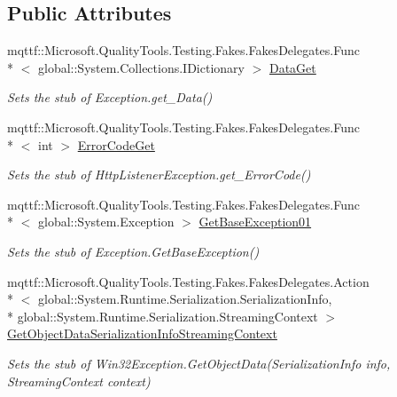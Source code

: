 \subsection*{Public Attributes}
\begin{DoxyCompactItemize}
\item 
mqttf\-::\-Microsoft.\-Quality\-Tools.\-Testing.\-Fakes.\-Fakes\-Delegates.\-Func\\*
$<$ global\-::\-System.\-Collections.\-I\-Dictionary $>$ \hyperlink{class_system_1_1_net_1_1_fakes_1_1_stub_http_listener_exception_a0e7c37c5aaf5e7d929dc7255406bb0e6}{Data\-Get}
\begin{DoxyCompactList}\small\item\em Sets the stub of Exception.\-get\-\_\-\-Data()\end{DoxyCompactList}\item 
mqttf\-::\-Microsoft.\-Quality\-Tools.\-Testing.\-Fakes.\-Fakes\-Delegates.\-Func\\*
$<$ int $>$ \hyperlink{class_system_1_1_net_1_1_fakes_1_1_stub_http_listener_exception_ac654e59004863eb65952dd2fde38d9b8}{Error\-Code\-Get}
\begin{DoxyCompactList}\small\item\em Sets the stub of Http\-Listener\-Exception.\-get\-\_\-\-Error\-Code()\end{DoxyCompactList}\item 
mqttf\-::\-Microsoft.\-Quality\-Tools.\-Testing.\-Fakes.\-Fakes\-Delegates.\-Func\\*
$<$ global\-::\-System.\-Exception $>$ \hyperlink{class_system_1_1_net_1_1_fakes_1_1_stub_http_listener_exception_a6b4826ad3861b16471149137b58f8fbe}{Get\-Base\-Exception01}
\begin{DoxyCompactList}\small\item\em Sets the stub of Exception.\-Get\-Base\-Exception()\end{DoxyCompactList}\item 
mqttf\-::\-Microsoft.\-Quality\-Tools.\-Testing.\-Fakes.\-Fakes\-Delegates.\-Action\\*
$<$ global\-::\-System.\-Runtime.\-Serialization.\-Serialization\-Info, \\*
global\-::\-System.\-Runtime.\-Serialization.\-Streaming\-Context $>$ \hyperlink{class_system_1_1_net_1_1_fakes_1_1_stub_http_listener_exception_aba44f8f6934146257ae4d5f9253fe294}{Get\-Object\-Data\-Serialization\-Info\-Streaming\-Context}
\begin{DoxyCompactList}\small\item\em Sets the stub of Win32\-Exception.\-Get\-Object\-Data(\-Serialization\-Info info, Streaming\-Context context)\end{DoxyCompactList}\item 

\end{DoxyCompactItemize}
